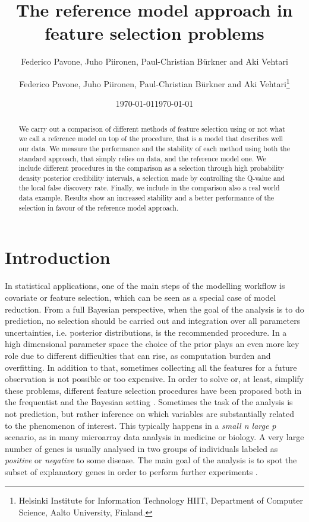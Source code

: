 \documentclass[american,]{article}
\title{The reference model approach in feature selection problems 
	\vspace{.1in}}
\author{Federico Pavone, Juho Piironen, Paul-Christian B\"{u}rkner and Aki Vehtari}
\author{
    Federico Pavone, 
  Juho Piironen,
  Paul-Christian B\"{u}rkner
  and Aki Vehtari\footnote{Helsinki Institute for Information Technology HIIT,
  Department of Computer Science, Aalto University, Finland.}
  }
\date{\today}
\date{\today}
\theoremstyle{definition}
\begin{document}
\maketitle
\begin{abstract}
We carry out a comparison of different methods of feature selection using or not what we call a reference model on top of the procedure, that is a model that describes well our data. We measure the performance and the stability of each method using both the standard approach, that simply relies on data, and the reference model one. We include different procedures in the comparison as a selection through high probability density posterior credibility intervals, a selection made by controlling the Q-value and the local false discovery rate. Finally, we include in the comparison also a real world data example. Results show an increased stability and a better performance of the selection in favour of the reference model approach.
\end{abstract}

\hypertarget{introduction}{%
\section{Introduction}\label{introduction}}

In statistical applications, one of the main steps of the modelling workflow is covariate or feature selection, which can be seen as a special case of model reduction. From a full Bayesian perspective, when the goal of the analysis is to do prediction, no selection should be carried out and integration over all parameters uncertainties, i.e. posterior distributions, is the recommended procedure. In a high dimensional parameter space the choice of the prior plays an even more key role due to different difficulties that can rise, as computation burden and overfitting. In addition to that, sometimes collecting all the features for a future observation is not possible or too expensive. In order to solve or, at least, simplify these problems, different feature selection procedures have been proposed both in the frequentist and the Bayesian setting \cite[e.g. see][]{paper:feature_selection,paper:vehtari_ojanen,paper:model_selection}. Sometimes the task of the analysis is not prediction, but rather inference on which variables are substantially related to the phenomenon of interest. This typically happens in a \textit{small n large p} scenario, as in many microarray data analysis in medicine or biology. A very large number of genes is usually analysed in two groups of individuals labeled as \textit{positive} or \textit{negative} to some disease. The main goal of the analysis is to spot the subset of explanatory genes in order to perform further experiments \cite[see examples in][]{book:efron}.
\end{document}
